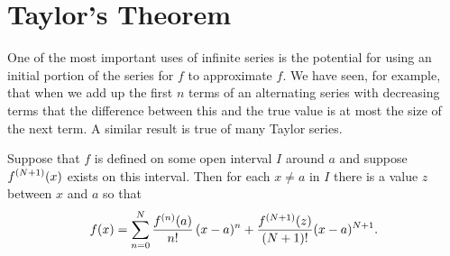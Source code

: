 \chapter{Taylor's Theorem}{}{}

\nobreak
One of the most important uses of infinite series is the potential for
using an initial portion of the series for $f$ to approximate $f$. We
have seen, for example, that when we add up the first $n$ terms of an
alternating series with decreasing terms that the difference between
this and the true value is at most the size of the next term. A
similar result is true of many Taylor series.

\begin{theorem} Suppose that $f$ is defined on some open interval $I$ around $a$ and
suppose $\displaystyle f^{(N+1)}(x)$ exists on this interval. Then
for each $x\not=a$ in $I$ there is a value $z$ between
$x$ and $a$ so that
$$ 
  f(x) = \sum_{n=0}^N {f^{(n)}(a)\over n!}\,(x-a)^n + 
  {f^{(N+1)}(z)\over (N+1)!}(x-a)^{N+1}. 
$$ 
\end{theorem}
